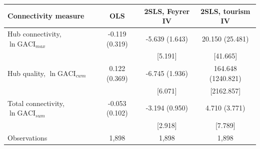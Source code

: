\begin{tabular}{lccc}
\toprule
Connectivity measure & OLS & 2SLS, Feyrer IV & 2SLS, tourism IV \\
\midrule
Hub connectivity, $\ln\mathrm{GACI}_{max}$ & -0.119 (0.319) & -5.639\sym{***} (1.643) & 20.150 (25.481) \\
 & & [5.191] & [41.665] \\
Hub quality, $\ln\mathrm{GACI}_{cwm}$ & 0.122 (0.369) & -6.745\sym{***} (1.936) & 164.648 (1240.821) \\
 & & [6.071] & [2162.857] \\
Total connectivity, $\ln\mathrm{GACI}_{sum}$ & -0.053 (0.102) & -3.194\sym{***} (0.950) & 4.710 (3.771) \\
 & & [2.918] & [7.789] \\
\midrule
Observations & 1,898 & 1,898 & 1,898 \\
\bottomrule
\end{tabular}
